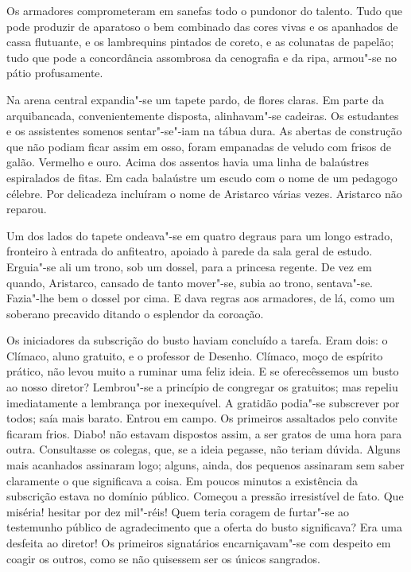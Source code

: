 Os armadores comprometeram em sanefas todo o pundonor do
talento. Tudo que pode produzir de aparatoso o bem combinado das cores
vivas e os apanhados de cassa flutuante, e os lambrequins pintados de
coreto, e as colunatas de papelão; tudo que pode a concordância
assombrosa da cenografia e da ripa, armou"-se no pátio profusamente.

Na arena central expandia"-se um tapete pardo, de flores claras. Em
parte da arquibancada, convenientemente disposta, alinhavam"-se
cadeiras. Os estudantes e os assistentes somenos sentar"-se"-iam na
tábua dura. As abertas de construção que não podiam ficar assim em
osso, foram empanadas de veludo com frisos de galão. Vermelho e ouro.
Acima dos assentos havia uma linha de balaústres espiralados de fitas.
Em cada balaústre um escudo com o nome de um pedagogo célebre. Por
delicadeza incluíram o nome de Aristarco várias vezes. Aristarco não
reparou. 

Um dos lados do tapete ondeava"-se em quatro degraus para um
longo estrado, fronteiro à entrada do anfiteatro, apoiado à parede da
sala geral de estudo. Erguia"-se ali um trono, sob um dossel, para a
princesa regente. De vez em quando, Aristarco, cansado de tanto
mover"-se, subia ao trono, sentava"-se. Fazia"-lhe bem o dossel por
cima. E dava regras aos armadores, de lá, como um soberano precavido
ditando o esplendor da coroação. 

Os iniciadores da subscrição do busto
haviam concluído a tarefa. Eram dois: o Clímaco, aluno gratuito, e o
professor de Desenho. Clímaco, moço de espírito prático, não levou
muito a ruminar uma feliz ideia. E se oferecêssemos um busto ao nosso
diretor? Lembrou"-se a princípio de congregar os gratuitos; mas
repeliu imediatamente a lembrança por inexequível. A gratidão
podia"-se subscrever por todos; saía mais barato. Entrou em campo. Os
primeiros assaltados pelo convite ficaram frios. Diabo! não estavam
dispostos assim, a ser gratos de uma hora para outra. Consultasse os
colegas, que, se a ideia pegasse, não teriam dúvida. Alguns mais
acanhados assinaram logo; alguns, ainda, dos pequenos assinaram sem
saber claramente o que significava a coisa. Em poucos minutos a
existência da subscrição estava no domínio público. Começou a pressão
irresistível de fato. Que miséria! hesitar por dez mil"-réis! Quem
teria coragem de furtar"-se ao testemunho público de agradecimento que
a oferta do busto significava? Era uma desfeita ao diretor! Os
primeiros signatários encarniçavam"-se com despeito em coagir os outros, como se
não quisessem ser os únicos sangrados. 

